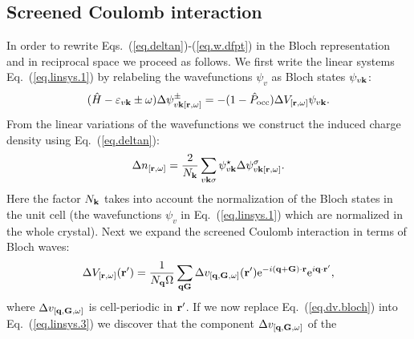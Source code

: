 \documentclass[twocolumn,prb,showpacs,superscriptaddress]{revtex4}
\def\w{\omega}
\def\H{\hat{H}}
\def\P{\hat{P}_{\rm occ}}
\def\E{\varepsilon}
\def\q{{\bf q}}
\def\s{\sigma}
\def\k{{\bf k}}
\def\G{{\bf G}}
\def\Gp{{\bf G^\prime}}
\def\r{{\bf r}}
\def\rp{{\bf r^\prime}}
\begin{document}

%
%
%

\subsection{Screened Coulomb interaction}\label{sec.coulomb.g}

In order to rewrite Eqs.\ (\ref{eq.deltan})-(\ref{eq.w.dfpt}) in
the Bloch representation and in reciprocal space we proceed as follows.
We first write the linear systems Eq.\ (\ref{eq.linsys.1})
by relabeling the wavefunctions $\psi_v$ as Bloch states $\psi_{v\k}$:
  \begin{equation}\label{eq.linsys.3}
  (\H-\E_{v\k}\pm\w) \Delta \psi^\pm_{v\k[\r,\w]}  = -(1-\P)  \Delta V_{[\r,\w]} \psi_{v\k}.
  \end{equation}
From the linear variations of the wavefunctions we construct the
induced charge density using Eq.\ (\ref{eq.deltan}):
  \begin{equation}\label{eq.ch}
  \Delta n_{[\r,\w]} = \frac{2}{N_\k}\sum_{v\k\s} \psi_{v\k}^\star  \Delta \psi^\s_{v\k[\r,\w]}.
  \end{equation}
Here the factor $N_\k$ takes into account the normalization of
the Bloch states in the unit cell (the 
wavefunctions $\psi_v$ in Eq.\ (\ref{eq.linsys.1}) which are normalized 
in the whole crystal).
Next we expand the screened Coulomb interaction in terms
of Bloch waves: 
  \begin{equation}\label{eq.dv.bloch}
  \Delta V_{[\r,\w]} (\rp) = \frac{1}{N_\q\Omega}  \sum_{\q\G} \Delta v_{[\q,\G,\w]}(\rp) 
   {\rm e}^{-i(\q+\G)\cdot\r} {\rm e}^{i\q\cdot\rp}, 
  \end{equation}
where $\Delta v_{[\q,\G,\w]}$ is cell-periodic in $\rp$.
If we now replace Eq.\ (\ref{eq.dv.bloch}) into Eq.\ (\ref{eq.linsys.3})
we discover that the component $\Delta v_{[\q,\G,\w]}$ of the
\end{document}
